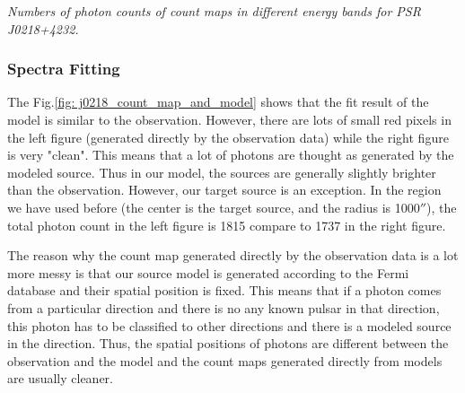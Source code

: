 \documentclass[12pt]{report}
\newcommand{\mycaption}[1]{\caption{\textit{\footnotesize #1}}}
\begin{document}
          \begin{table}[!h]   
            \centering
            \mycaption{Numbers of photon counts of count maps in different energy bands for PSR J0218+4232.}
            \label{table:j0218_ccube_photon_counts}
          \end{table}
          \subsubsection{Spectra Fitting}
            The Fig.\ref{fig: j0218_count_map_and_model} shows that the fit result of the model 
            is similar to the observation. However, 
            there are lots of small red pixels in the left figure (generated directly by the observation data) while the 
            right figure is very "clean". This means that a lot of photons are thought as generated by the modeled 
            source. Thus in our model, the sources are generally slightly brighter than the observation. However, our target
            source is an exception. In the region we have used before (the center is the target source, and the radius is
            1000$''$), the total photon count in the left figure is 1815 compare to 1737 in the right figure. 

            The reason why the count map generated directly by the observation data is a lot more messy is that our source 
            model is generated according to the Fermi database and their spatial position is fixed. This means that if 
            a photon comes from a particular direction and there is no any known pulsar in that direction, this 
            photon has to be classified to other directions and there is a modeled source in the direction.  
            Thus, the spatial positions of photons are different between the observation and the model and 
            the count maps generated directly from models are usually cleaner. 
            
\end{document}
